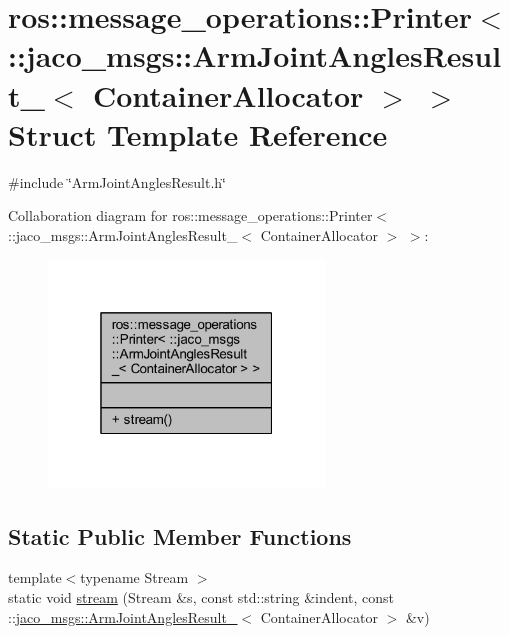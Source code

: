 \hypertarget{structros_1_1message__operations_1_1Printer_3_01_1_1jaco__msgs_1_1ArmJointAnglesResult___3_01ContainerAllocator_01_4_01_4}{}\section{ros\+:\+:message\+\_\+operations\+:\+:Printer$<$ \+:\+:jaco\+\_\+msgs\+:\+:Arm\+Joint\+Angles\+Result\+\_\+$<$ Container\+Allocator $>$ $>$ Struct Template Reference}
\label{structros_1_1message__operations_1_1Printer_3_01_1_1jaco__msgs_1_1ArmJointAnglesResult___3_01ContainerAllocator_01_4_01_4}


{\ttfamily \#include \char`\"{}Arm\+Joint\+Angles\+Result.\+h\char`\"{}}



Collaboration diagram for ros\+:\+:message\+\_\+operations\+:\+:Printer$<$ \+:\+:jaco\+\_\+msgs\+:\+:Arm\+Joint\+Angles\+Result\+\_\+$<$ Container\+Allocator $>$ $>$\+:
\nopagebreak
\begin{figure}[H]
\begin{center}
\leavevmode
\includegraphics[width=208pt]{d6/d3b/structros_1_1message__operations_1_1Printer_3_01_1_1jaco__msgs_1_1ArmJointAnglesResult___3_01Con8283c83832234a4525c7826a47afc361}
\end{center}
\end{figure}
\subsection*{Static Public Member Functions}
\begin{DoxyCompactItemize}
\item 
{\footnotesize template$<$typename Stream $>$ }\\static void \hyperlink{structros_1_1message__operations_1_1Printer_3_01_1_1jaco__msgs_1_1ArmJointAnglesResult___3_01ContainerAllocator_01_4_01_4_aadb7e34a58cc22b6301489d2e6661bad}{stream} (Stream \&s, const std\+::string \&indent, const \+::\hyperlink{structjaco__msgs_1_1ArmJointAnglesResult__}{jaco\+\_\+msgs\+::\+Arm\+Joint\+Angles\+Result\+\_\+}$<$ Container\+Allocator $>$ \&v)
\end{DoxyCompactItemize}


